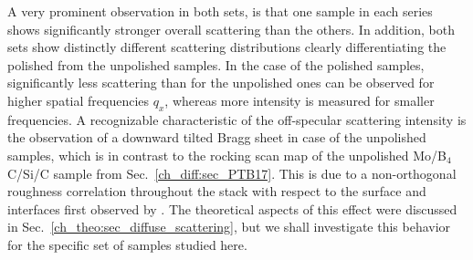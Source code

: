 A very prominent observation in both sets, is that one sample in each series shows significantly stronger overall scattering than the others. In addition, both sets show distinctly different scattering distributions clearly differentiating the polished from the unpolished samples. In the case of the polished samples, significantly less scattering than for the unpolished ones can be observed for higher spatial frequencies $q_x$, whereas more intensity is measured for smaller frequencies. A recognizable characteristic of the off-specular scattering intensity is the observation of a downward tilted Bragg sheet in case of the unpolished samples, which is in contrast to the rocking scan map of the unpolished Mo/B$_4$C/Si/C sample from Sec.~\ref{ch_diff:sec_PTB17}. This is due to a non-orthogonal roughness correlation throughout the stack with respect to the surface and interfaces first observed by \textcite{gullikson_asymmetric_1999}. The theoretical aspects of this effect were discussed in Sec.~\ref{ch_theo:sec_diffuse_scattering}, but we shall investigate this behavior for the specific set of samples studied here.


